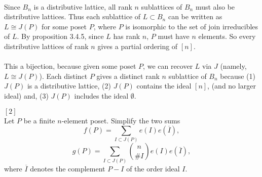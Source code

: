 \documentclass{article}
\newenvironment{problem}[2][Problem]{\begin{trivlist}
\item[\hskip \labelsep {\bfseries #1}\hskip \labelsep {\bfseries #2.}]}{\end{trivlist}}
\newenvironment{solution}[1][Solution.]{\begin{trivlist}
\item[\hskip \labelsep {\bfseries #1}]}{\end{trivlist}}
\begin{document}
\begin{solution} \text{} \\
  Since $B_n$ is a distributive lattice, all rank $n$ sublattices of $B_n$ must
  also be distributive lattices. Thus each sublattice of $L \subset B_n$ can be
  written as $L \cong J(P)$ for some poset $P$, where $P$ is isomorphic to the
  set of join irreducibles of $L$. By proposition 3.4.5, since $L$ has rank $n$,
  $P$ must have $n$ elements. So every distributive lattices of rank $n$ gives
  a partial ordering of $[n]$.
  \\~\\
  This a bijection, because given some poset $P$, we can recover $L$ via $J$
  (namely, $L \cong J(P)$). Each distinct $P$ gives a distinct rank $n$
  sublattice of $B_n$ because
  (1) $J(P)$ is a distributive lattice,
  (2) $J(P)$ contains the ideal $[n]$,
  (and no larger ideal) and,
  (3) $J(P)$ includes the ideal $\emptyset$.
\end{solution}
\pagebreak
\begin{problem}{53} $[2]$ \\
  Let $P$ be a finite $n$-element poset. Simplify the two sums \[
    f(P) = \sum_{I \subset J(P)} e(I)e(\overline I),
  \] \[
    g(P) = \sum_{I \subset J(P)} \binom{n}{\#I} e(I)e(\overline I),
  \] where $\overline I$ denotes the complement $P - I$ of the order ideal $I$.
\end{problem}
\end{document}
